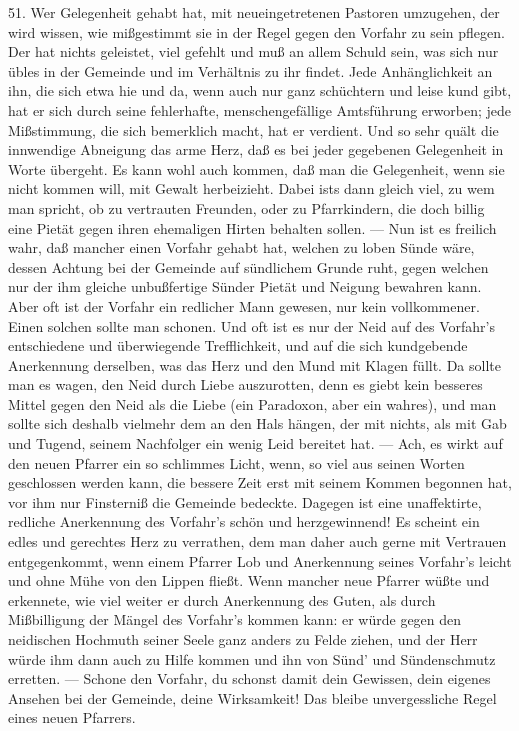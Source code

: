 51. Wer Gelegenheit gehabt hat, mit neueingetretenen Pastoren umzugehen, der wird wissen, wie mißgestimmt sie in der Regel gegen den Vorfahr zu sein pflegen. Der hat nichts geleistet, viel gefehlt und muß an allem Schuld sein, was sich nur übles in der Gemeinde und im Verhältnis zu ihr findet. Jede Anhänglichkeit an ihn, die sich etwa hie und da, wenn auch nur ganz schüchtern und leise kund gibt, hat er sich durch seine fehlerhafte, menschengefällige Amtsführung erworben; jede Mißstimmung, die sich bemerklich macht, hat er verdient. Und so sehr quält die innwendige Abneigung das arme Herz, daß es bei jeder gegebenen Gelegenheit in Worte übergeht. Es kann wohl auch kommen, daß man die Gelegenheit, wenn sie nicht kommen will, mit Gewalt herbeizieht. Dabei ists dann gleich viel, zu
wem man spricht, ob zu vertrauten Freunden, oder zu Pfarrkindern, die doch billig eine Pietät gegen ihren ehemaligen Hirten behalten sollen. — Nun ist es freilich wahr, daß mancher einen Vorfahr gehabt hat, welchen zu loben Sünde wäre, dessen Achtung bei der Gemeinde auf sündlichem Grunde ruht, gegen welchen nur der ihm gleiche unbußfertige Sünder Pietät und Neigung bewahren kann. Aber oft ist der Vorfahr ein redlicher Mann gewesen, nur kein vollkommener. Einen solchen sollte man schonen. Und oft ist es nur der Neid auf des Vorfahr’s entschiedene und überwiegende Trefflichkeit, und auf die sich kundgebende Anerkennung derselben, was das Herz und den Mund mit Klagen füllt. Da sollte man es wagen, den Neid durch Liebe auszurotten, denn es giebt kein besseres Mittel gegen den Neid als die Liebe (ein Paradoxon, aber ein wahres), und man sollte sich deshalb vielmehr dem an den Hals hängen, der mit nichts, als mit Gab und Tugend, seinem Nachfolger ein wenig Leid bereitet hat. — Ach, es wirkt auf den neuen Pfarrer ein so schlimmes Licht, wenn, so viel aus seinen Worten geschlossen werden kann, die bessere Zeit erst mit seinem Kommen begonnen hat, vor ihm nur Finsterniß die Gemeinde bedeckte. Dagegen ist eine unaffektirte, redliche Anerkennung des Vorfahr’s schön und herzgewinnend! Es scheint ein edles und gerechtes Herz zu verrathen, dem man daher auch gerne mit Vertrauen entgegenkommt, wenn einem Pfarrer Lob und Anerkennung seines Vorfahr’s leicht und ohne Mühe von den Lippen fließt. Wenn mancher neue Pfarrer wüßte und erkennete, wie viel weiter er durch Anerkennung des Guten, als
durch Mißbilligung der Mängel des Vorfahr’s kommen kann: er würde gegen den neidischen Hochmuth seiner Seele ganz anders zu Felde ziehen, und der Herr würde ihm dann auch zu Hilfe kommen und ihn von Sünd’ und Sündenschmutz erretten. — Schone den Vorfahr, du schonst damit dein Gewissen, dein eigenes Ansehen bei der Gemeinde, deine Wirksamkeit! Das bleibe unvergessliche Regel eines neuen Pfarrers.

